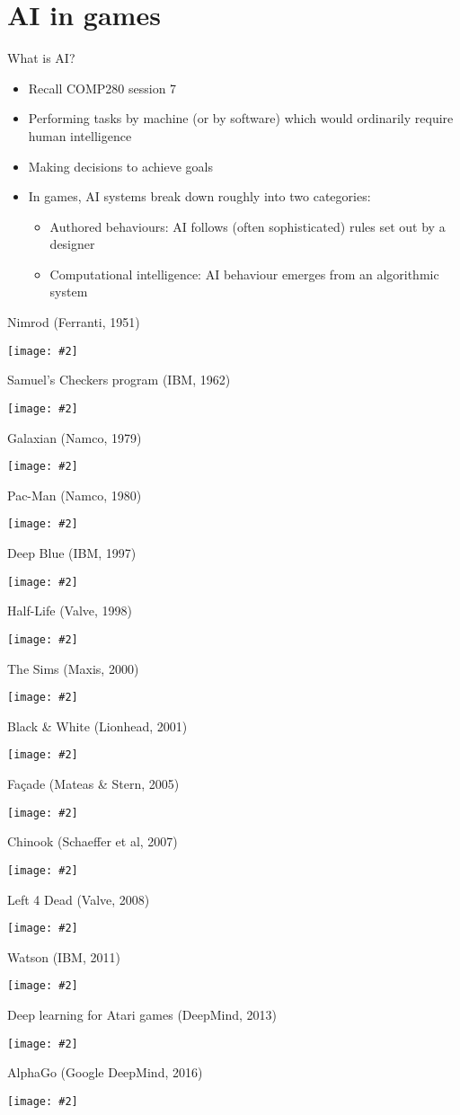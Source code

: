 \newcommand{\pictureslideb}[3]{
	\begin{frame}{#1}
		\begin{center}
			#3
			
			\vspace{6pt}
			
			\texttt{[image: \#2]}
		\end{center}
	\end{frame}
}

\newcommand{\pictureslide}[2]{
	\begin{frame}{#1}
		\begin{center}
			\texttt{[image: \#2]}
		\end{center}
	\end{frame}
}

\part{AI in games}
\frame{\partpage}

\begin{frame}{What is AI?}
	\begin{itemize}
		\pause\item Recall COMP280 session 7
		\pause\item Performing tasks by machine (or by software) which would ordinarily require human intelligence 
		\pause\item Making decisions to achieve goals
		\pause\item In games, AI systems break down roughly into two categories:
			\begin{itemize}
				\pause\item Authored behaviours: AI follows (often sophisticated) rules set out by a designer
				\pause\item Computational intelligence: AI behaviour emerges from an algorithmic system
			\end{itemize}
	\end{itemize}
\end{frame}

\pictureslide{Nimrod (Ferranti, 1951)}{nimrod}
\pictureslide{Samuel's Checkers program (IBM, 1962)}{samuel}
\pictureslide{Galaxian (Namco, 1979)}{galaxian}
\pictureslide{Pac-Man (Namco, 1980)}{pacman}
\pictureslide{Deep Blue (IBM, 1997)}{deep_blue}
\pictureslide{Half-Life (Valve, 1998)}{half_life}
\pictureslide{The Sims (Maxis, 2000)}{sims}
\pictureslide{Black \& White (Lionhead, 2001)}{black_white}
\pictureslide{Fa\c{c}ade (Mateas \& Stern, 2005)}{facade}
\pictureslide{Chinook (Schaeffer et al, 2007)}{chinook}
\pictureslide{Left 4 Dead (Valve, 2008)}{left_4_dead}
\pictureslide{Watson (IBM, 2011)}{watson}
\pictureslide{Deep learning for Atari games (DeepMind, 2013)}{deepmind_atari}
\pictureslide{AlphaGo (Google DeepMind, 2016)}{alphago}

